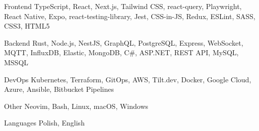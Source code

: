 

\begin{cvskills}

  \cvskill
    {Frontend} %
    {TypeScript, React, Next.js, Tailwind CSS, react-query, Playwright, React Native, Expo, react-testing-library, Jest, CSS-in-JS, Redux, ESLint, SASS, CSS3, HTML5} %

  \cvskill
    {Backend} %
    {Rust, Node.js, NestJS, GraphQL, PostgreSQL, Express, WebSocket, MQTT, InfluxDB, Elastic, MongoDB, C\#, ASP.NET, REST API, MySQL, MSSQL} %
    
  \cvskill
    {DevOps} %
    {Kubernetes, Terraform, GitOps, AWS, Tilt.dev, Docker, Google Cloud, Azure, Ansible, Bitbucket Pipelines} %
    
  \cvskill
    {Other} %
    {Neovim, Bash, Linux, macOS, Windows} %

  \cvskill
    {Languages} %
    {Polish, English} %

\end{cvskills}
